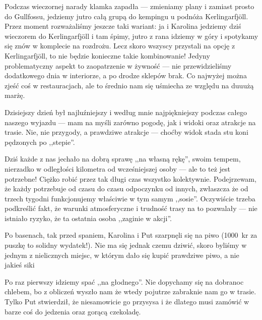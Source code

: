 Podczas wieczornej narady klamka zapadła --- zmieniamy plany i zamiast prosto do Gullfossu, jedziemy jutro całą grupą do kempingu u podnóża Kerlingarfjöll. Przez moment rozważaliśmy jeszcze taki wariant: ja i Karolina jedziemy dziś wieczorem do Kerlingarfjöll i tam śpimy, jutro z rana idziemy w góry i spotykamy się znów w komplecie na rozdrożu. Lecz skoro wszyscy przystali na opcję z Kerlingarfjöll, to nie będzie konieczne takie kombinowanie! Jedyny problematyczny aspekt to zaopatrzenie w żywność --- nie przewidzieliśmy dodatkowego dnia w interiorze, a po drodze sklepów brak. Co najwyżej można zjeść coś w restauracjach, ale to średnio nam się uśmiecha ze względu na duuużą marżę.

Dzisiejszy dzień był najluźniejszy i według mnie najpiękniejszy podczas całego naszego wyjazdu --- mam na myśli zarówno pogodę, jak i widoki oraz atrakcje na trasie. Nie, nie przygody, a prawdziwe atrakcje --- choćby widok stada stu koni pędzonych po ,,stepie''.

Dziś każde z nas jechało na dobrą sprawę ,,na własną rękę'', swoim tempem, nierzadko w odległości kilometra od wcześniejszej osoby --- ale to też jest potrzebne! Ciężko robić przez tak długi czas wszystko kolektywnie. Podejrzewam, że każdy potrzebuje od czasu do czasu odpoczynku od innych, zwłaszcza że od trzech tygodni funkcjonujemy właściwie w tym samym ,,sosie''. Oczywiście trzeba podkreślić fakt, że warunki atmosferyczne i trudność trasy na to pozwalały --- nie istniało ryzyko, że ta ostatnia osoba ,,zaginie w akcji''.

Po basenach, tak przed spaniem, Karolina i Put szarpnęli się na piwo (1000~kr za puszkę to solidny wydatek!). Nie ma się jednak czemu dziwić, skoro byliśmy w jednym z nielicznych miejsc, w którym dało się kupić prawdziwe piwo, a nie jakieś siki\textellipsis

Po raz pierwszy idziemy spać ,,na głodnego''. Nie dopychamy się na dobranoc chlebem, bo z obliczeń wyszło nam że wtedy pojutrze zabraknie nam go w trasie. Tylko Put stwierdził, że niesamowicie go przysysa i że dlatego musi zamówić w barze coś do jedzenia oraz gorącą czekoladę.
